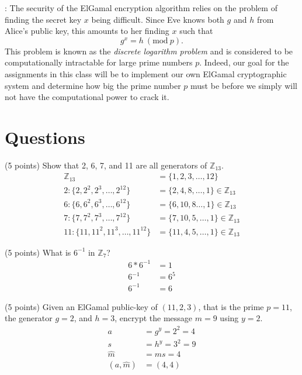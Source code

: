 \documentclass{article}
\newcommand{\myhrule}{ \begin{center}\rule{.9\linewidth}{.25mm}\end{center} }
\newcommand{\pad}{\vspace{8pt}\noindent}
\newcommand{\Mod}[1]{\ (\mathrm{mod}\ #1)}
\begin{document}
\pad{\bf Security}:
The security of the ElGamal encryption algorithm relies on the problem of finding the secret key $x$ being difficult. Since Eve knows both $g$ and $h$ from Alice's public key, this amounts to her finding $x$ such that 
\[
g^x = h\Mod{p}.
\]
This problem is known as the {\em discrete logarithm problem} and is considered to be computationally intractable for large prime numbers $p$. Indeed, our goal for the assignments in this class will be to implement our own ElGamal cryptographic system and determine how big the prime number $p$ must be before we simply will not have the computational power to crack it. 


\section*{Questions}

(5 points) Show that 2, 6, 7, and 11 are all generators of $\mathbb{Z}_{13}$.
\begin{align}
    \mathbb{Z}_{13} &= \{1,2,3,\ldots,12\} \\
    2: \{2, 2^2, 2^3, \ldots, 2^{12}\} &= \{2, 4, 8, \ldots, 1\} \in \mathbb{Z}_{13} \\
    6: \{6, 6^2, 6^3, \ldots, 6^{12}\} &= \{6, 10, 8 \ldots, 1\} \in \mathbb{Z}_{13} \\
    7:  \{7, 7^2, 7^3, \ldots, 7^{12}\} &= \{7, 10, 5, \ldots, 1\} \in \mathbb{Z}_{13} \\
    11:  \{11, 11^2, 11^3, \ldots, 11^{12}\} &= \{11, 4, 5, \ldots, 1\} \in \mathbb{Z}_{13}
\end {align}
\vspace*{1em}

(5 points) What is $6^{-1}$ in $\mathbb{Z}_{7}$?
\begin{align}
    6*6^{-1} &= 1 \\
    6^{-1} &= 6^5 \\
    6^{-1} &= 6
\end{align}
\vspace*{1em}

(5 points) Given an ElGamal public-key of $(11,2,3)$, that is the prime $p = 11$, the generator $g = 2$, and $h = 3$, encrypt the message $m = 9$ using $y = 2$. 
\begin{align}
    a &= g^y = 2^2 = 4 \\
    s &= h^y = 3^2 = 9 \\
    \hat{m} &= ms = 4 \\
    (a, \hat{m}) &= (4, 4)
\end{align}
\vspace*{1em}
\end{document}
